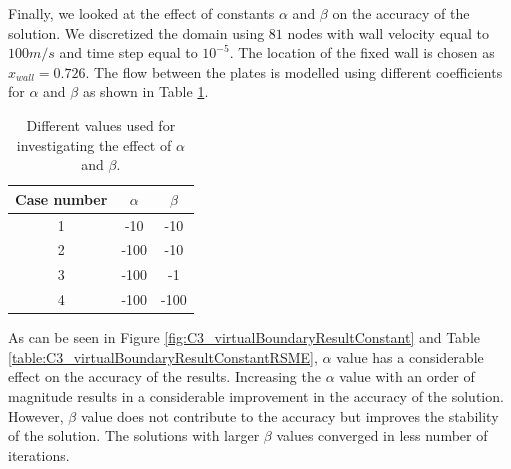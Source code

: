 Finally, we looked at the effect of constants $\alpha$ and $\beta$ on the accuracy of the solution. We discretized the domain using $81$ nodes with wall velocity equal to $100 m/s$ and time step equal to $10^{-5}$. The location of the fixed wall is chosen as $x_{wall} = 0.726$. The flow between the plates is modelled using different coefficients for $\alpha$ and $\beta$ as shown in Table \ref{table:C3_alphaBetaValues}.

\begin{table}[H]
\centering
\begin{tabular}{c | c | c}
     Case number & $\alpha$ & $\beta$ \\ \hline \hline
     1 & -10 & -10 \\ \hline
     2 & -100 & -10 \\ \hline
     3 & -100 & -1 \\ \hline
     4 & -100 & -100 \\
\end{tabular}
\caption{Different values used for investigating the effect of $\alpha$ and $\beta$.}
\label{table:C3_alphaBetaValues}
\end{table}

As can be seen in Figure \ref{fig:C3_virtualBoundaryResultConstant} and Table \ref{table:C3_virtualBoundaryResultConstantRSME}, $\alpha$ value has a considerable effect on the accuracy of the results. Increasing the $\alpha$ value with an order of magnitude results in a considerable improvement in the accuracy of the solution. However, $\beta$ value does not contribute to the accuracy but improves the stability of the solution. The solutions with larger $\beta$ values converged in less number of iterations.

